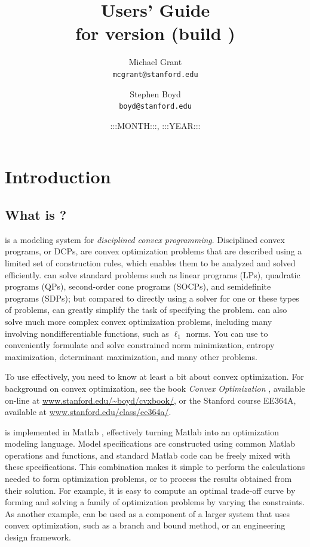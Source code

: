 \documentclass[12pt]{article}
\title{\cvx Users' Guide\\\large for \cvx version \cvxver (build \cvxbuild)}
\author{Michael Grant\\\texttt{mcgrant@stanford.edu} 
\and Stephen Boyd\\\texttt{boyd@stanford.edu}}
\date{:::MONTH:::, :::YEAR:::}
\begin{document}
\maketitle
\clearpage
\tableofcontents
\clearpage

\section{Introduction}

\subsection{What is \cvx?}

\cvx is a modeling system for \emph{disciplined convex programming}. 
Disciplined convex programs, or DCPs, are convex optimization problems 
that are described using a limited set of construction rules, which
enables them to be analyzed and solved efficiently.  \cvx can solve 
standard problems such as linear programs (LPs), quadratic programs (QPs),
second-order cone programs (SOCPs), and semidefinite programs (SDPs);
but compared to directly using a solver for one or these types of problems,
\cvx can greatly simplify the task of specifying the problem.
\cvx can also solve much more complex convex optimization problems,
including many involving nondifferentiable functions, such as $\ell_1$
norms.
You can use \cvx to conveniently formulate and solve
constrained norm minimization, entropy maximization,
determinant maximization, and many other problems.

To use \cvx effectively, you need to know at least a bit about 
convex optimization.
For background on convex optimization,
see the book \emph{Convex Optimization} \cite{BV:04}, available on-line
at \url{www.stanford.edu/~boyd/cvxbook/}, or the 
Stanford course EE364A, available at
\url{www.stanford.edu/class/ee364a/}.

\cvx is implemented in Matlab \cite{MATLAB}, effectively
turning Matlab into an optimization modeling language.
Model specifications are constructed using common Matlab
operations and functions, and standard Matlab code can be
freely mixed with these specifications. This combination
makes it simple to perform the calculations
needed to form optimization problems, or to process the
results obtained from their solution. For example, it is easy
to compute an optimal trade-off curve
by forming and solving a family of optimization problems
by varying the constraints. As another example, \cvx can
be used as a component of a larger system that uses convex
optimization, such as a branch and bound method,
or an engineering design framework.
\end{document}
